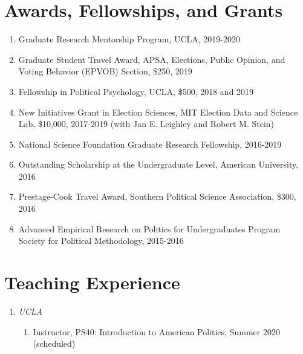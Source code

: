 \documentclass[11pt]{article}
\begin{document}
\section*{Awards, Fellowships, and Grants} 

\begin{enumerate}[topsep = 0pt, itemsep = 1ex, partopsep  = 1ex, parsep = 1ex]
	
	\item[] Graduate Research Mentorship Program, UCLA, 2019-2020
	
	\item[] Graduate Student Travel Award, APSA, Elections, Public Opinion, and Voting Behavior (EPVOB) Section, \$250, 2019
	
	\item[] Fellowship in Political Psychology, UCLA, \$500, 2018 and 2019
	
	\item[] New Initiatives Grant in Election Sciences, MIT Election Data and Science Lab, \$10,000, 2017-2019 (with Jan E. Leighley and Robert M. Stein)
	
	\item[] National Science Foundation Graduate Research Fellowship, 2016-2019
	
	\item[] Outstanding Scholarship at the Undergraduate Level, American University, 2016
	
	\item[] Prestage-Cook Travel Award, Southern Political Science Association, \$300, 2016
	
	\item[] Advanced Empirical Research on Politics for Undergraduates Program Society for Political Methodology, 2015-2016
	
\end{enumerate}

\section*{Teaching Experience}

\begin{enumerate}[topsep = 0pt, itemsep = -1ex, partopsep  = 1ex, parsep = 1ex]
	
	\item[] \textit{UCLA}
	
	\begin{enumerate}[topsep = 0pt, itemsep = -1ex, partopsep = -1ex, parsep = 1ex]
		
		\item[] Instructor, PS40: Introduction to American Politics, Summer 2020 (scheduled)
		
	\end{enumerate}

\end{enumerate}
\end{document}
